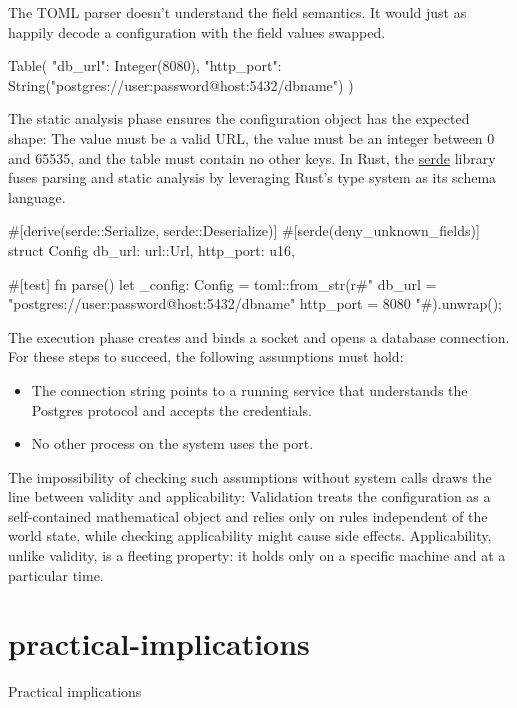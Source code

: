 \documentclass{article}
\begin{document}
The TOML parser doesn't understand the field semantics.
It would just as happily decode a configuration with the field values swapped.

\begin{code}
Table({
  "db_url": Integer(8080),
  "http_port": String("postgres://user:password@host:5432/dbname")
})
\end{code}

The static analysis phase ensures the configuration object has the expected shape:
The  value must be a valid URL,
the  value must be an integer between 0 and 65535,
and the table must contain no other keys.
In Rust, the \href{https://serde.rs}{serde} library fuses parsing and static analysis by leveraging Rust's type system as its schema language.

\begin{code}[rust]
#[derive(serde::Serialize, serde::Deserialize)]
#[serde(deny_unknown_fields)]
struct Config {
    db_url: url::Url,
    http_port: u16,
}

#[test]
fn parse() {
    let _config: Config = toml::from_str(r#"
db_url = "postgres://user:password@host:5432/dbname"
http_port = 8080
"#).unwrap();
}
\end{code}

The execution phase creates and binds a socket and opens a database connection.
For these steps to succeed, the following assumptions must hold:
\begin{itemize}
\item The connection string points to a running service that understands the Postgres protocol and accepts the credentials.
\item No other process on the system uses the port.
\end{itemize}

The impossibility of checking such assumptions without system calls draws the line between validity and applicability:
Validation treats the configuration as a self-contained mathematical object and relies only on rules independent of the world state,
while checking applicability might cause side effects.
Applicability, unlike validity, is a fleeting property:
it holds only on a specific machine and at a particular time.

\section{practical-implications}{Practical implications}
\end{document}

